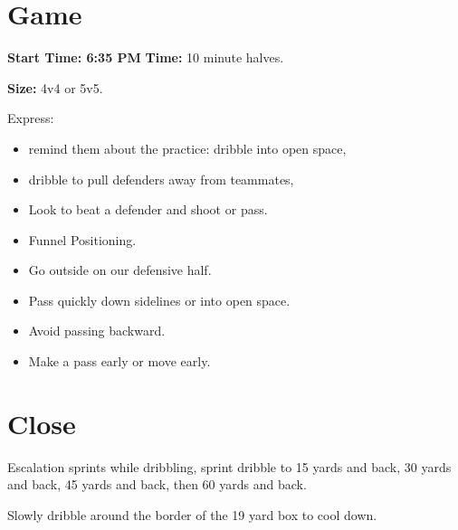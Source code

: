 \documentclass[10pt,letterpaper]{article}
\newenvironment{oddBlock}[1]{%
    \tcolorbox[beamer,%
    noparskip,breakable,
    colback=LightBlue,colframe=DarkBlue,%
    colbacklower=DarkBlue!75!LightBlue,%
    title=#1]}%
    {\endtcolorbox}
\begin{document}
\section{Game}

\begin{oddBlock}{Small Sided}
    \textbf{Start Time: 6:35 PM}
    \textbf{Time:} 10 minute halves.

    \textbf{Size:} 4v4 or 5v5.

    Express:
    \begin{itemize}
        \setlength{\itemsep}{0pt}
        \setlength{\parskip}{0pt}
        \setlength{\parsep}{0pt}
        \item  remind them about the practice: dribble into open space,
        \item dribble to pull defenders away from teammates,
        \item Look to beat a defender and shoot or pass.
        \item Funnel Positioning.
        \item Go outside on our defensive half.
        \item Pass quickly down sidelines or into open space.
        \item Avoid passing backward.
        \item Make a pass early or move early.
    \end{itemize}

\end{oddBlock}

\section{Close}
\begin{oddBlock}{Sprints}
    Escalation sprints while dribbling, sprint dribble to 15 yards and back, 30 yards and back, 45 yards and back, then 60 yards and back.

    \vspace{12pt}
    
    Slowly dribble around the border of the 19 yard box to cool down.

\end{oddBlock}
\end{document}
